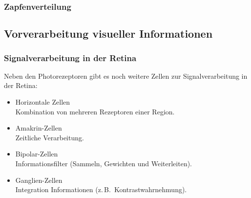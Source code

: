 \documentclass[a4paper, 11pt, accentcolor = tud3b]{tudreport}
\newcommand{\zB}{z.\,B.~}
\begin{document}
				\subsubsection{Zapfenverteilung} %

			\subsection{Vorverarbeitung visueller Informationen}
				\subsubsection{Signalverarbeitung in der Retina}
					Neben den Photorezeptoren gibt es noch weitere Zellen zur Signalverarbeitung in der Retina:
					\begin{itemize}
						\item Horizontale Zellen \\ Kombination von mehreren Rezeptoren einer Region.
						\item Amakrin-Zellen \\ Zeitliche Verarbeitung.
						\item Bipolar-Zellen \\ Informationsfilter (Sammeln, Gewichten und Weiterleiten).
						\item Ganglien-Zellen \\ Integration Informationen (\zB Kontrastwahrnehmung).
					\end{itemize}
\end{document}
